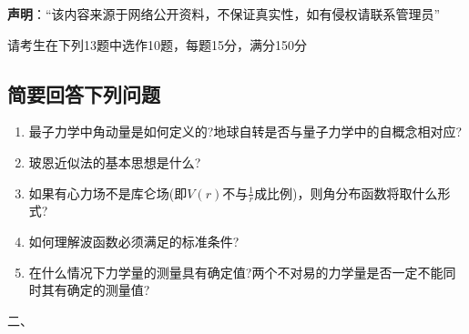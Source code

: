 
\textbf{声明}：“该内容来源于网络公开资料，不保证真实性，如有侵权请联系管理员”

请考生在下列13题中选作10题，每题15分，满分150分
\subsection{简要回答下列问题}
\begin{enumerate}
\item 最子力学中角动量是如何定义的?地球自转是否与量子力学中的自概念相对应?
\item 玻恩近似法的基本思想是什么?
\item 如果有心力场不是库仑场(即$V(r)$不与$\frac{1}{r}$成比例)，则角分布函数将取什么形式?
\item 如何理解波函数必须满足的标准条件?
\item 在什么情况下力学量的测量具有确定值?两个不对易的力学量是否一定不能同时其有确定的测量值?
\end{enumerate}
二、